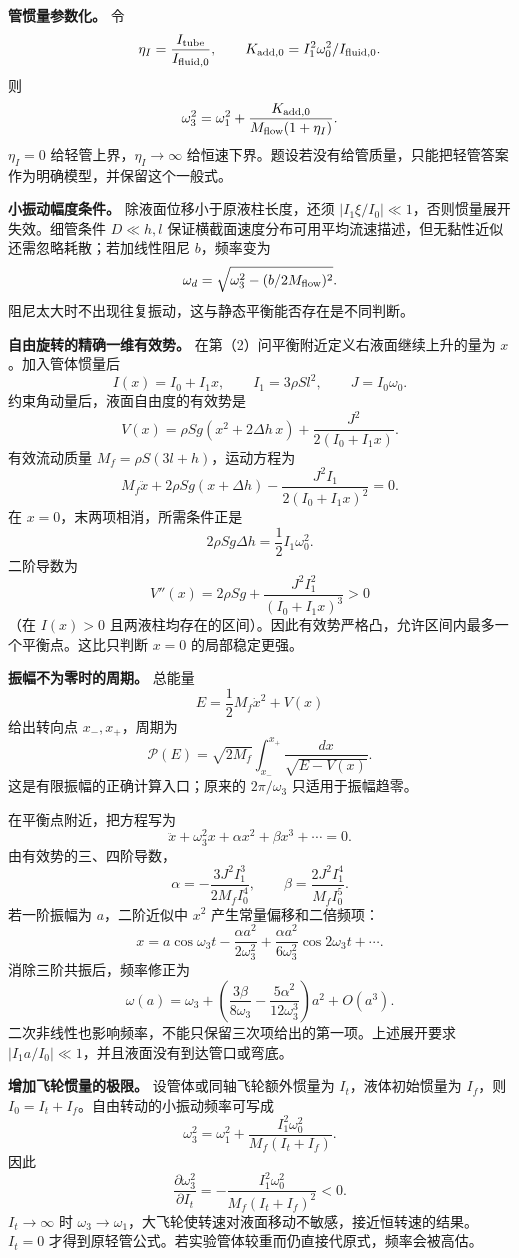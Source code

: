 \documentclass[12pt,a4paper,UTF8]{ctexart}
\begin{document}
\textbf{管惯量参数化。} 令 \[
\eta_I=\frac{I_{\rm tube}}{I_{\rm fluid,0}},
\qquad K_{\rm add,0}=I_1^2\omega_0^2/I_{\rm fluid,0}.
\] 则 \[
\omega_3^2=\omega_1^2+
\frac{K_{\rm add,0}}{M_{\rm flow}(1+\eta_I)}.
\] \(\eta_I=0\) 给轻管上界，\(\eta_I\to\infty\)
给恒速下界。题设若没有给管质量，只能把轻管答案作为明确模型，并保留这个一般式。

\textbf{小振动幅度条件。} 除液面位移小于原液柱长度，还须
\(|I_1\xi/I_0|\ll1\)，否则惯量展开失效。细管条件 \(D\ll h,l\)
保证横截面速度分布可用平均流速描述，但无黏性近似还需忽略耗散；若加线性阻尼
\(b\)，频率变为 \[
\omega_d=\sqrt{\omega_3^2-(b/2M_{\rm flow})^2}.
\] 阻尼太大时不出现往复振动，这与静态平衡能否存在是不同判断。

\textbf{自由旋转的精确一维有效势。}
在第（2）问平衡附近定义右液面继续上升的量为 \(x\)。加入管体惯量后 \[
I(x)=I_0+I_1x,\qquad I_1=3\rho Sl^2,\qquad J=I_0\omega_0.
\] 约束角动量后，液面自由度的有效势是 \[
V(x)=\rho Sg(x^2+2\Delta h\,x)+\frac{J^2}{2(I_0+I_1x)}.
\] 有效流动质量 \(M_f=\rho S(3l+h)\)，运动方程为 \[
M_f\ddot x+2\rho Sg(x+\Delta h)
-\frac{J^2I_1}{2(I_0+I_1x)^2}=0.
\] 在 \(x=0\)，末两项相消，所需条件正是 \[
2\rho Sg\Delta h=\frac12I_1\omega_0^2.
\] 二阶导数为 \[
V''(x)=2\rho Sg+
\frac{J^2I_1^2}{(I_0+I_1x)^3}>0
\] （在 \(I(x)>0\)
且两液柱均存在的区间）。因此有效势严格凸，允许区间内最多一个平衡点。这比只判断
\(x=0\) 的局部稳定更强。

\textbf{振幅不为零时的周期。} 总能量 \[
E=\frac12M_f\dot x^2+V(x)
\] 给出转向点 \(x_-,x_+\)，周期为 \[
\boxed{\mathcal P(E)=\sqrt{2M_f}
\int_{x_-}^{x_+}\frac{dx}{\sqrt{E-V(x)}}}.
\] 这是有限振幅的正确计算入口；原来的 \(2\pi/\omega_3\)
只适用于振幅趋零。

在平衡点附近，把方程写为 \[
\ddot x+\omega_3^2x+\alpha x^2+\beta x^3+\cdots=0.
\] 由有效势的三、四阶导数， \[
\alpha=-\frac{3J^2I_1^3}{2M_fI_0^4},
\qquad
\beta=\frac{2J^2I_1^4}{M_fI_0^5}.
\] 若一阶振幅为 \(a\)，二阶近似中 \(x^2\) 产生常量偏移和二倍频项： \[
x=a\cos\omega_3t
-\frac{\alpha a^2}{2\omega_3^2}
+\frac{\alpha a^2}{6\omega_3^2}\cos2\omega_3t+\cdots.
\] 消除三阶共振后，频率修正为 \[
\boxed{\omega(a)=\omega_3+
\left(\frac{3\beta}{8\omega_3}
-\frac{5\alpha^2}{12\omega_3^3}\right)a^2+O(a^3)}.
\] 二次非线性也影响频率，不能只保留三次项给出的第一项。上述展开要求
\(|I_1a/I_0|\ll1\)，并且液面没有到达管口或弯底。

\textbf{增加飞轮惯量的极限。} 设管体或同轴飞轮额外惯量为
\(I_t\)，液体初始惯量为 \(I_f\)，则
\(I_0=I_t+I_f\)。自由转动的小振动频率可写成 \[
\omega_3^2=\omega_1^2+\frac{I_1^2\omega_0^2}{M_f(I_t+I_f)}.
\] 因此 \[
\frac{\partial\omega_3^2}{\partial I_t}
=-\frac{I_1^2\omega_0^2}{M_f(I_t+I_f)^2}<0.
\] \(I_t\to\infty\) 时
\(\omega_3\to\omega_1\)，大飞轮使转速对液面移动不敏感，接近恒转速的结果。\(I_t=0\)
才得到原轻管公式。若实验管体较重而仍直接代原式，频率会被高估。
\end{document}
